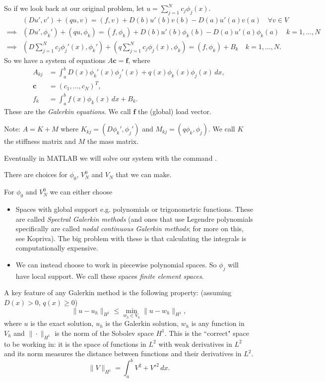 \documentclass[12pt, a4paper]{article}
\renewcommand{\vec}[1]{\mathbf{#1}}
\theoremstyle{definition}
\theoremstyle{remark}
\numberwithin{equation}{section}
\begin{document}
So if we look back at our original problem, let $u = \sum_{j=1}^N c_j \phi_j(x)$.
\begin{align*}
&( Du',v' ) +( qu,v ) = ( f,v ) +D(b)u'(b)v(b)-D(a)u'(a)v(a) \quad \forall v\in V\\
\implies &( Du',\phi_k' ) +( qu,\phi_k ) = ( f,\phi_k ) +D(b)u'(b)\phi_k(b)-D(a)u'(a)\phi_k(a) \quad k=1,\ldots,N\\
 \implies &( D\sum_{j=1}^N c_j \phi_j'(x),\phi_k' ) +( q\sum_{j=1}^N c_j \phi_j(x),\phi_k ) 
= ( f,\phi_k ) +B_k \quad k=1,\ldots,N.
\end{align*}
So we have a system of equations $A\vec{c}=\vec{f}$, 
where 
\begin{align*}
A_{kj} &= \int_a^b D(x)\phi_k'(x)\phi_j'(x)+q(x)\phi_k(x)\phi_j(x) \, dx,\\
\vec{c} &= (c_1,\dots,c_N)^T,\\
f_k &=\int_a^b f(x)\phi_k(x) \, dx +B_k.
\end{align*}
These are the \emph{Galerkin equations}.
We call $\vec{f}$ the (global)  load vector. 

Note: $A=K+M$ where $K_{kj}=( D\phi_k' , \phi_j' )$ and $M_{kj}= ( q \phi_k, \phi_j )$. We call $K$ the stiffness matrix and $M$ the mass matrix.

Eventually in MATLAB we will solve our system with the command \mbox{}.

There are choices for $\phi_0$, $V_N^0$ and $V_N$ that we can make.

For $\phi_0$ and $V_N^0$ we can either choose
\begin{itemize}
\item Spaces with global support e.g. polynomials or trigonometric functions. These are called \emph{Spectral Galerkin methods} (and ones that use Legendre polynomials specifically are called \emph{nodal continuous Galerkin methods}; for more on this, see Kopriva). The big problem with these is that calculating the integrals is computationally expensive.
\item We can instead choose to work in piecewise polynomial spaces. So $\phi_j$ will have local support. We call these spaces \emph{finite element spaces}.
\end{itemize}



A key feature of any Galerkin method is the following property: (assuming $D(x)>0$, $q(x) \ge 0$)
\begin{equation*}
\|u-u_h\|_{H^1} \le  \min\limits_{w_h\in V_h} \|u-w_{h}\|_{H^1},
\end{equation*}
where $u$ is the exact solution, $u_h$ is the Galerkin solution, $w_h$ is any function in $V_h$ and $\| \cdot \|_{H^1}$ is the  norm of the Sobolev space $H^1$. 
This is the ``correct" space to be working in: it is the space of functions in $L^2$ with weak derivatives in $L^2$ and its norm measures the distance between functions and their derivatives in $L^2$.
\begin{equation*}
\|V\|_{H^1}=\int_a^bV^2 +V'^2\,dx.
\end{equation*}
\end{document}
